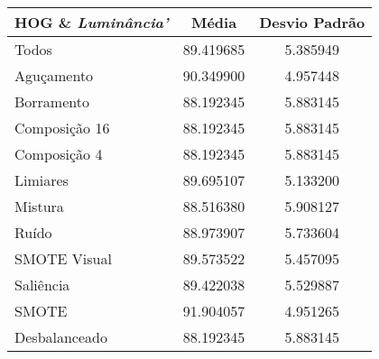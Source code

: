 

\begin{table}[!htbp]
\centering
\caption{}
\label{tab:resultados:x:melhor}
\begin{tabular}{|l|c|c|}
\hline
\textbf{HOG  \& \emph{Luminância'}} & \textbf{Média}     & \textbf{Desvio Padrão} \\ \hline
   Todos        &  89.419685 &  5.385949  \\ \hline
  Aguçamento    &  90.349900 &  4.957448  \\ \hline
  Borramento    &  88.192345 &  5.883145  \\ \hline
  Composição 16 &  88.192345 &  5.883145  \\ \hline
  Composição 4  &  88.192345 &  5.883145  \\ \hline
  Limiares      &  89.695107 &  5.133200  \\ \hline
  Mistura       &  88.516380 &  5.908127  \\ \hline
  Ruído         &  88.973907 &  5.733604  \\ \hline
  SMOTE Visual  &  89.573522 &  5.457095  \\ \hline
  Saliência     &  89.422038 &  5.529887  \\ \hline
 SMOTE          &  91.904057 &  4.951265  \\ \hline
Desbalanceado   &  88.192345 &  5.883145  \\ \hline
\end{tabular}
\end{table}

